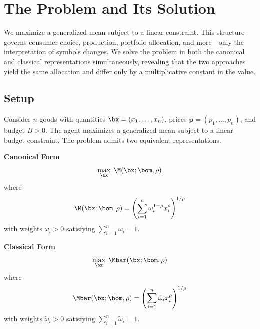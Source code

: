 \section{The Problem and Its Solution}
\label{sec:problem-solution}

We maximize a generalized mean subject to a linear constraint. This structure governs consumer choice, production, portfolio allocation, and more---only the interpretation of symbols changes. We solve the problem in both the canonical and classical representations simultaneously, revealing that the two approaches yield the same allocation and differ only by a multiplicative constant in the value.

\subsection{Setup}
\label{subsec:setup}

Consider $n$ goods with quantities $\bx = (x_1, \ldots, x_n)$, prices $\mathbf{p} = (p_1, \ldots, p_n)$, and budget $B > 0$. The agent maximizes a generalized mean subject to a linear budget constraint. The problem admits two equivalent representations.

\medskip
\noindent
\begin{minipage}[t]{0.48\textwidth}
\centering\textbf{Canonical Form}
\begin{equation}
\max_{\bx} \; \M(\bx; \bom, \rho)
\label{eq:canonical-obj}
\end{equation}
where
\begin{equation}
\M(\bx; \bom, \rho) = \left( \sum_{i=1}^{n} \omega_i^{1-\rho} x_i^\rho \right)^{1/\rho}
\label{eq:canonical-mean}
\end{equation}
with weights $\omega_i > 0$ satisfying $\sum_{i=1}^n \omega_i = 1$.
\end{minipage}%
\hfill
\begin{minipage}[t]{0.48\textwidth}
\centering\textbf{Classical Form}
\begin{equation}
\max_{\bx} \; \Mbar(\bx; \tilde{\bom}, \rho)
\label{eq:classical-obj}
\end{equation}
where
\begin{equation}
\Mbar(\bx; \tilde{\bom}, \rho) = \left( \sum_{i=1}^{n} \tilde{\omega}_i x_i^\rho \right)^{1/\rho}
\label{eq:classical-mean}
\end{equation}
with weights $\tilde{\omega}_i > 0$ satisfying $\sum_{i=1}^n \tilde{\omega}_i = 1$.
\end{minipage}

